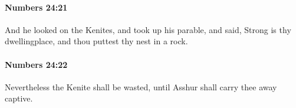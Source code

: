 		\paragraph{Numbers 24:21} %
			\label{NUMBERS-24-21}

			And he looked on the Kenites, and took up his parable, and said, Strong is thy dwellingplace, and thou puttest thy nest in a rock.


		\paragraph{Numbers 24:22} %
			\label{NUMBERS-24-22}

			Nevertheless the Kenite shall be wasted, until Asshur shall carry thee away captive.


